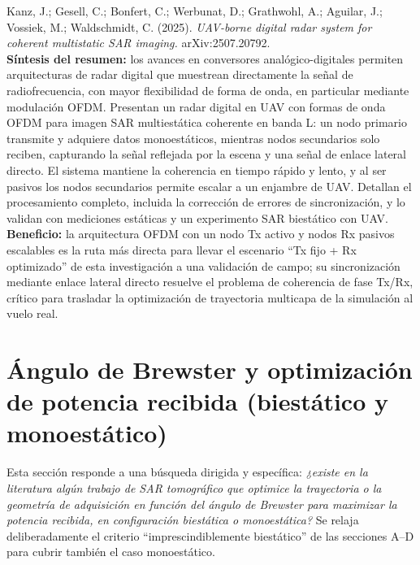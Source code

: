 \documentclass[11pt,a4paper]{report}
\begin{document}
\begin{enumerate}[label=\textbf{[D\arabic*]}, leftmargin=2.2cm, itemsep=10pt]
\item Kanz, J.; Gesell, C.; Bonfert, C.; Werbunat, D.; Grathwohl, A.;
Aguilar, J.; Vossiek, M.; Waldschmidt, C. (2025). \textit{UAV-borne digital
radar system for coherent multistatic SAR imaging.} arXiv:2507.20792.
\cite{kanz2025}\\
\textbf{Síntesis del resumen:} los avances en conversores analógico-digitales
permiten arquitecturas de radar digital que muestrean directamente la señal
de radiofrecuencia, con mayor flexibilidad de forma de onda, en particular
mediante modulación OFDM. Presentan un radar digital en UAV con formas de
onda OFDM para imagen SAR multiestática coherente en banda L: un nodo
primario transmite y adquiere datos monoestáticos, mientras nodos
secundarios solo reciben, capturando la señal reflejada por la escena y una
señal de enlace lateral directo. El sistema mantiene la coherencia en tiempo
rápido y lento, y al ser pasivos los nodos secundarios permite escalar a un
enjambre de UAV. Detallan el procesamiento completo, incluida la corrección
de errores de sincronización, y lo validan con mediciones estáticas y un
experimento SAR biestático con UAV.\\
\textbf{Beneficio:} la arquitectura OFDM con un nodo Tx activo y nodos Rx
pasivos escalables es la ruta más directa para llevar el escenario
``Tx fijo + Rx optimizado'' de esta investigación a una validación de campo;
su sincronización mediante enlace lateral directo resuelve el problema de
coherencia de fase Tx/Rx, crítico para trasladar la optimización de
trayectoria multicapa de la simulación al vuelo real.

\end{enumerate}

\section{Ángulo de Brewster y optimización de potencia recibida (biestático y monoestático)}
\label{sec:brewster}

Esta sección responde a una búsqueda dirigida y específica: \emph{¿existe en
la literatura algún trabajo de SAR tomográfico que optimice la trayectoria o
la geometría de adquisición en función del ángulo de Brewster para
maximizar la potencia recibida, en configuración biestática o
monoestática?} Se relaja deliberadamente el criterio ``imprescindiblemente
biestático'' de las secciones A--D para cubrir también el caso monoestático.
\end{document}
